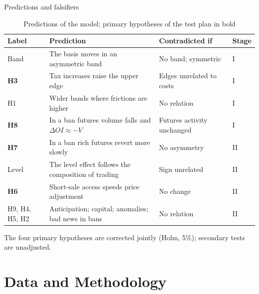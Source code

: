 \documentclass[11pt]{beamer}
\begin{document}
\begin{frame}{Predictions and falsifiers}
  \begin{table}
    \scriptsize
    \caption{Predictions of the model; primary hypotheses of the test plan in bold}
    \begin{tabular}{@{}p{1.4cm}p{5.1cm}p{2.6cm}p{1.2cm}@{}}
      \toprule
      Label & Prediction & Contradicted if & Stage \\
      \midrule
      Band & The basis moves in an asymmetric band & No band; symmetric & I \\
      \textbf{H3} & Tax increases raise the upper edge & Edges unrelated to costs & I \\
      H1 & Wider bands where frictions are higher & No relation & I \\
      \textbf{H8} & In a ban futures volume falls and $\Delta OI\approx -V$ & Futures activity unchanged & I \\
      \midrule
      \textbf{H7} & In a ban rich futures revert more slowly & No asymmetry & II \\
      Level & The level effect follows the composition of trading & Sign unrelated & II \\
      \textbf{H6} & Short-sale access speeds price adjustment & No change & II \\
      H9, H4, H5, H2 & Anticipation; capital; anomalies; bad news in bans & No relation & II \\
      \bottomrule
    \end{tabular}
  \end{table}
  \footnotesize The four primary hypotheses are corrected jointly (Holm, 5\%); secondary tests are unadjusted.
\end{frame}

\section{Data and Methodology}
\end{document}
